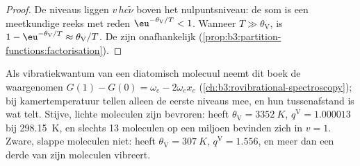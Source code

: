 \begin{proof}
De niveaus liggen $v\,hc\tilde\nu$ boven het nulpuntsniveau: de som is een
meetkundige reeks
met reden $\eu^{-\theta_{\mathrm V}/T} < 1$. Wanneer $T \gg \theta_{\mathrm V}$, is $1 - \eu^{-\theta_{\mathrm V}/T} \approx \theta_{\mathrm V}/T$.
De  zijn onafhankelijk (\cref{prop:b3:partition-functions:factorisation}).
\end{proof}

Als vibratiekwantum van een diatomisch molecuul neemt dit boek de
waargenomen  $G(1) - G(0) = \omega_e - 2\omega_ex_e$
(\cref{ch:b3:rovibrational-spectroscopy}); bij kamertemperatuur tellen
alleen de eerste niveaus mee, en hun tussenafstand is wat telt. Stijve,
lichte moleculen zijn bevroren:  heeft $\theta_{\mathrm V} = \qty{3352}{K}$, $q^{\mathrm V} = 1.000013$ bij \qty{298.15}{K}, en
slechts 13 moleculen op een miljoen bevinden zich in $v = 1$. Zware,
slappe moleculen niet: 
heeft $\theta_{\mathrm V} = \qty{307}{K}$, $q^{\mathrm V} = 1.556$, en meer dan een
derde van zijn moleculen vibreert.

